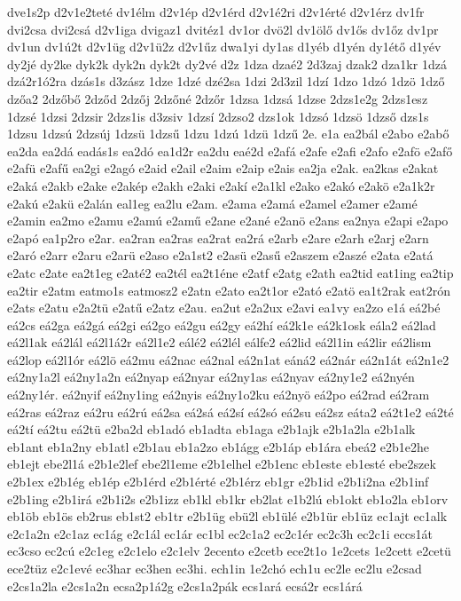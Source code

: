 {dve1s2p
d2v1e2teté
dv1élm
d2v1ép
d2v1érd
d2v1é2ri
d2v1érté
d2v1érz
dv1fr
dvi2csa
dvi2csá
d2v1iga
dvigaz1
dvitéz1
dv1or
dvö2l
dv1ölő
dv1ős
dv1őz
dv1pr
dv1un
dv1ú2t
d2v1üg
d2v1ü2z
d2v1űz
dwa1yi
dy1as
d1yéb
d1yén
dy1étő
d1yév
dy2jé
dy2ke
dyk2k
dyk2n
dyk2t
dy2vé
d2z
1dza
dzaé2
2d3zaj
dzak2
dza1kr
1dzá
dzá2r1ó2ra
dzás1s
d3zász
1dze
1dzé
dzé2sa
1dzi
2d3zil
1dzí
1dzo
1dzó
1dzö
1dző
dzőa2
2dzőbő
2dződ
2dzőj
2dzőné
2dzőr
1dzsa
1dzsá
1dzse
2dzs1e2g
2dzs1esz
1dzsé
1dzsi
2dzsir
2dzs1is
d3zsiv
1dzsí
2dzso2
dzs1ok
1dzsó
1dzsö
1dzső
dzs1s
1dzsu
1dzsú
2dzsúj
1dzsü
1dzsű
1dzu
1dzú
1dzü
1dzű
2e.
e1a
ea2bál
e2abo
e2abő
ea2da
ea2dá
eadás1s
ea2dó
ea1d2r
ea2du
eaé2d
e2afá
e2afe
e2afi
e2afo
e2afö
e2afő
e2afü
e2afű
ea2gi
e2agó
e2aid
e2ail
e2aim
e2aip
e2ais
ea2ja
e2ak.
ea2kas
e2akat
e2aká
e2akb
e2ake
e2akép
e2akh
e2aki
e2akí
e2a1kl
e2ako
e2akó
e2akö
e2a1k2r
e2akú
e2akü
e2alán
eal1eg
ea2lu
e2am.
e2ama
e2amá
e2amel
e2amer
e2amé
e2amin
ea2mo
e2amu
e2amú
e2amű
e2ane
e2ané
e2anö
e2ans
ea2nya
e2api
e2apo
e2apó
ea1p2ro
e2ar.
ea2ran
ea2ras
ea2rat
ea2rá
e2arb
e2are
e2arh
e2arj
e2arn
e2aró
e2arr
e2aru
e2arü
e2aso
e2a1st2
e2asü
e2asű
e2aszem
e2aszé
e2ata
e2atá
e2atc
e2ate
ea2t1eg
e2até2
ea2tél
ea2t1éne
e2atf
e2atg
e2ath
ea2tid
eat1ing
ea2tip
ea2tir
e2atm
eatmo1s
eatmosz2
e2atn
e2ato
ea2t1or
e2ató
e2atö
ea1t2rak
eat2rón
e2ats
e2atu
e2a2tü
e2atű
e2atz
e2au.
ea2ut
e2a2ux
e2avi
ea1vy
ea2zo
e1á
eá2bé
eá2cs
eá2ga
eá2gá
eá2gi
eá2go
eá2gu
eá2gy
eá2hí
eá2k1e
eá2k1osk
eála2
eá2lad
eá2l1ak
eá2lál
eá2l1á2r
eá2l1e2
eálé2
eá2lél
eálfe2
eá2lid
eá2l1in
eá2lir
eá2lism
eá2lop
eá2l1ór
eá2lö
eá2mu
eá2nac
eá2nal
eá2n1at
eáná2
eá2nár
eá2n1át
eá2n1e2
eá2ny1a2l
eá2ny1a2n
eá2nyap
eá2nyar
eá2ny1as
eá2nyav
eá2ny1e2
eá2nyén
eá2ny1ér.
eá2nyif
eá2ny1ing
eá2nyis
eá2ny1o2ku
eá2nyö
eá2po
eá2rad
eá2ram
eá2ras
eá2raz
eá2ru
eá2rú
eá2sa
eá2sá
eá2sí
eá2só
eá2su
eá2sz
eáta2
eá2t1e2
eá2té
eá2tí
eá2tu
eá2tü
e2ba2d
eb1adó
eb1adta
eb1aga
e2b1ajk
e2b1a2la
e2b1alk
eb1ant
eb1a2ny
eb1atl
e2b1au
eb1a2zo
eb1ágg
e2b1áp
eb1ára
ebeá2
e2b1e2he
eb1ejt
ebe2l1á
e2b1e2lef
ebe2l1eme
e2b1elhel
e2b1enc
eb1este
eb1esté
ebe2szek
e2b1ex
e2b1ég
eb1ép
e2b1érd
e2b1érté
e2b1érz
eb1gr
e2b1id
e2b1i2na
e2b1inf
e2b1ing
e2b1irá
e2b1i2s
e2b1izz
eb1kl
eb1kr
eb2lat
e1b2lú
eb1okt
eb1o2la
eb1orv
eb1öb
eb1ös
eb2rus
eb1st2
eb1tr
e2b1üg
ebü2l
eb1ülé
e2b1ür
eb1üz
ec1ajt
ec1alk
e2c1a2n
e2c1az
ec1ág
e2c1ál
ec1ár
ec1bl
ec2c1a2
ec2c1ér
ec2c3h
ec2c1i
eccs1át
ec3cso
ec2cú
e2c1eg
e2c1elo
e2c1elv
2ecento
e2cetb
ece2t1o
1e2cets
1e2cett
e2cetü
ece2tüz
e2c1evé
ec3har
ec3hen
ec3hi.
ech1in
1e2chó
ech1u
ec2le
ec2lu
e2csad
e2cs1a2la
e2cs1a2n
ecsa2p1á2g
e2cs1a2pák
ecs1ará
ecsá2r
ecs1árá
}
